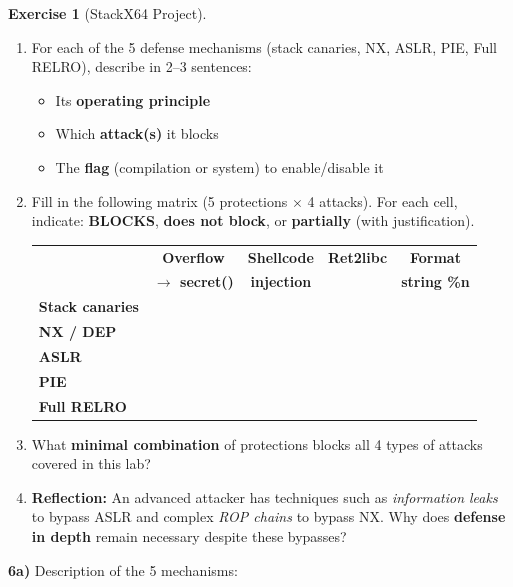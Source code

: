 \documentclass[a4paper,11pt]{article}
\theoremstyle{plain}
\theoremstyle{definition}
\newtheorem{exercice}{Exercise}
\begin{document}
\begin{exercice}[StackX64 Project]
\begin{enumerate}
\item[\textbf{6a)}] For each of the 5 defense mechanisms (stack canaries, NX, ASLR, PIE, Full RELRO), describe in 2--3 sentences:
\begin{itemize}
    \item Its \textbf{operating principle}
    \item Which \textbf{attack(s)} it blocks
    \item The \textbf{flag} (compilation or system) to enable/disable it
\end{itemize}

\item[\textbf{6b)}] Fill in the following matrix (5 protections $\times$ 4 attacks). For each cell, indicate: \textbf{BLOCKS}, \textbf{does not block}, or \textbf{partially} (with justification).

\begin{center}
\begin{tabular}{l|c|c|c|c}
\toprule
& \textbf{Overflow} & \textbf{Shellcode} & \textbf{Ret2libc} & \textbf{Format} \\
& \textbf{$\to$ secret()} & \textbf{injection} & & \textbf{string \%n} \\
\midrule
\textbf{Stack canaries} & & & & \\
\midrule
\textbf{NX / DEP} & & & & \\
\midrule
\textbf{ASLR} & & & & \\
\midrule
\textbf{PIE} & & & & \\
\midrule
\textbf{Full RELRO} & & & & \\
\bottomrule
\end{tabular}
\end{center}

\item[\textbf{6c)}] What \textbf{minimal combination} of protections blocks all 4 types of attacks covered in this lab?

\item[\textbf{6d)}] \textbf{Reflection:} An advanced attacker has techniques such as \textit{information leaks} to bypass ASLR and complex \textit{ROP chains} to bypass NX. Why does \textbf{defense in depth} remain necessary despite these bypasses?
\end{enumerate}

\begin{correction}

\textbf{6a)} Description of the 5 mechanisms:


\end{correction}
\end{exercice}
\end{document}
